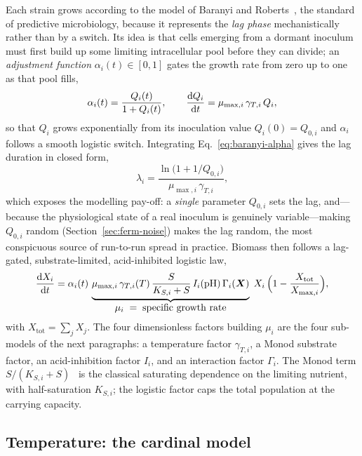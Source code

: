 Each strain grows according to the model of Baranyi and Roberts~\cite{baranyi},
the standard of predictive microbiology, because it represents the \emph{lag
phase} mechanistically rather than by a switch. Its idea is that cells emerging
from a dormant inoculum must first build up some limiting intracellular pool before
they can divide; an \emph{adjustment function} $\alpha_i(t)\in[0,1]$ gates the
growth rate from zero up to one as that pool fills,
%
\begin{equation}
\alpha_i(t) = \frac{Q_i(t)}{1+Q_i(t)},
\qquad
\frac{\mathrm{d} Q_i}{\mathrm{d} t} = \mu_{\max,i}\,\gamma_{T,i}\,Q_i,
\label{eq:baranyi-alpha}
\end{equation}
%
so that $Q_i$ grows exponentially from its inoculation value $Q_i(0)=Q_{0,i}$ and
$\alpha_i$ follows a smooth logistic switch. Integrating
Eq.~\eqref{eq:baranyi-alpha} gives the lag duration in closed form,
%
\begin{equation}
\lambda_i = \frac{\ln\!\bigl(1 + 1/Q_{0,i}\bigr)}{\mu_{\max,i}\,\gamma_{T,i}},
\label{eq:lag}
\end{equation}
%
which exposes the modelling pay-off: a \emph{single} parameter $Q_{0,i}$ sets the
lag, and---because the physiological state of a real inoculum is genuinely
variable---making $Q_{0,i}$ random (Section~\ref{sec:ferm-noise}) makes the lag
random, the most conspicuous source of run-to-run spread in practice. Biomass then
follows a lag-gated, substrate-limited, acid-inhibited logistic law,
%
\begin{equation}
\frac{\mathrm{d} X_i}{\mathrm{d} t}
= \alpha_i(t)\,\underbrace{\mu_{\max,i}\,
   \gamma_{T,i}(T)\,
   \frac{S}{K_{S,i}+S}\,
   I_i(\mathrm{pH})\,
   \Gamma_i(\bm X)}_{\textstyle \mu_i \;=\; \text{specific growth rate}}
\;X_i\,
\Bigl(1-\frac{X_{\mathrm{tot}}}{X_{\max,i}}\Bigr),
\label{eq:growth}
\end{equation}
%
with $X_{\mathrm{tot}}=\sum_j X_j$. The four dimensionless factors building $\mu_i$
are the four sub-models of the next paragraphs: a temperature factor
$\gamma_{T,i}$, a Monod substrate factor, an acid-inhibition factor $I_i$, and an
interaction factor $\Gamma_i$. The Monod term $S/(K_{S,i}+S)$~\cite{monod} is the
classical saturating dependence on the limiting nutrient, with half-saturation
$K_{S,i}$; the logistic factor caps the total population at the carrying capacity.

\subsection{Temperature: the cardinal model}

